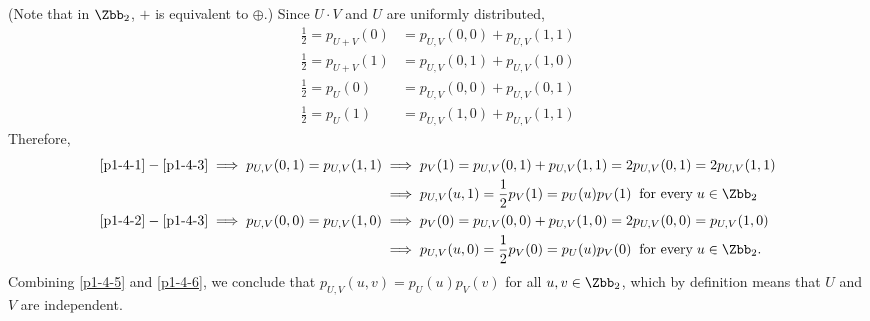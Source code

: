 \begin{answer}[iv]
    (Note that in $\Zbb_2$, $+$ is equivalent to $\oplus$.)
    Since $U\cdot V$ and $U$ are uniformly distributed,
    \begin{align}
        \frac{1}{2}=p_{U+ V}(0) &= p_{U,V}(0,0)+p_{U,V}(1,1) \label{p1-4-1}\\
        \frac{1}{2}=p_{U+ V}(1) &= p_{U,V}(0,1)+p_{U,V}(1,0) \label{p1-4-2}\\
        \frac{1}{2}=p_{U}(0) &= p_{U,V}(0,0)+p_{U,V}(0,1) \label{p1-4-3}\\
        \frac{1}{2}=p_{U}(1) &= p_{U,V}(1,0)+p_{U,V}(1,1) \label{p1-4-4}
    \end{align}
    Therefore,
    \begin{align}
        \eqref{p1-4-1}-\eqref{p1-4-3} \implies p_{U,V}(0,1)=p_{U,V}(1,1) &\implies p_V(1) =  p_{U,V}(0,1) +p_{U,V}(1,1) = 2p_{U,V}(0,1) = 2p_{U,V}(1,1) \notag\\
        &\implies p_{U,V}(u,1) = \frac{1}{2}p_V(1) = p_U(u)p_V(1)\;\; \textrm{for every} \; u\in \Zbb_2 \label{p1-4-5}  \\
        \eqref{p1-4-2}-\eqref{p1-4-3} \implies p_{U,V}(0,0) =p_{U,V}(1,0) &\implies p_V(0) =  p_{U,V}(0,0) +p_{U,V}(1,0) = 2p_{U,V}(0,0) = p_{U,V}(1,0) \notag\\
        &\implies p_{U,V}(u,0) = \frac{1}{2}p_V(0) = p_U(u)p_V(0)\;\; \textrm{for every} \; u\in \Zbb_2. \label{p1-4-6} 
    \end{align}
    Combining \eqref{p1-4-5} and \eqref{p1-4-6}, we conclude that $p_{U,V}(u,v)=p_U(u)p_V(v)$ for all $u,v\in \Zbb_2$, which by definition means that $U$ and $V$ are independent. 
\end{answer}